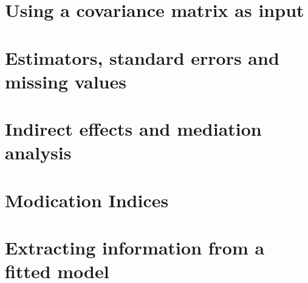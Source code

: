 \documentclass{article}
\begin{document}
\section{Using a covariance matrix as input}

\section{Estimators, standard errors and missing values}

\section{Indirect effects and mediation analysis}

\section{Modication Indices}

\section{Extracting information from a fitted model}

\end{document}
